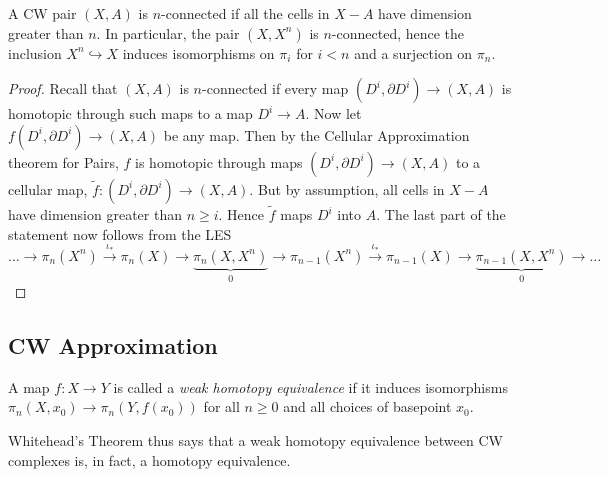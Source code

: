 \begin{corollary}\label{n-connectedness-geometrically}
    A CW pair $\left( X,A \right) $ is $n$-connected
    if all the cells in $X - A$ have dimension
    greater than $n$. In particular, the
    pair  $\left( X, X^{n} \right) $ is
    $n$-connected, hence the
    inclusion $X^{n} \hookrightarrow X$ induces
    isomorphisms on $\pi_i$ for $i < n$ and
    a surjection on $\pi_n$.
\end{corollary}

\begin{proof}
    Recall that $\left( X,A \right) $ is $n$-connected
    if every map
    $\left( D^{i}, \partial D^{i} \right) 
    \to \left( X,A \right) $ is homotopic through
    such maps to a map $D^{i} \to A$.
    Now let
    $f \left( D^{i}, \partial D^{i} \right) 
    \to \left( X,A \right) $ be any map.
    Then by the Cellular Approximation theorem for
    Pairs, $f$ is homotopic through maps
    $\left( D^{i} ,\partial D^{i} \right) \to 
    \left( X,A \right) $ to a cellular map, 
    $\tilde{f} \colon \left( D^{i} , \partial D^{i} \right) 
    \to \left( X,A \right) $. But by assumption, all
    cells in $X-A$ have dimension greater than
    $n \ge i$. Hence $\tilde{f}$ maps
    $D^{i}$ into $A$.
    The last part of the statement now follows from the LES
    \[
    \ldots \to \pi_n (X^{n}) \stackrel{\iota_*}{\to} \pi_n(X) \to 
    \underbrace{\pi_n\left( X,X^{n} \right)}_{0} \to 
    \pi_{n-1}(X^{n}) \stackrel{\iota_*}{\to}  \pi_{n-1}(X) \to 
    \underbrace{\pi_{n-1}\left( X, X^{n} \right)}_{0} \to \ldots
    \] 
\end{proof}

\subsection{CW Approximation}

\begin{definition}
    A map $f \colon X \to Y$ is called a
    \textit{weak homotopy equivalence} if it induces
    isomorphisms $\pi_n \left( X, x_0 \right) 
    \to \pi_n \left( Y, f(x_0) \right) $ for all
    $n \ge 0$ and all choices
    of basepoint $x_0$.
\end{definition}

\begin{remark}
    Whitehead's Theorem thus says that
    a weak homotopy equivalence between
     CW complexes is, in fact, a homotopy equivalence.
\end{remark}


